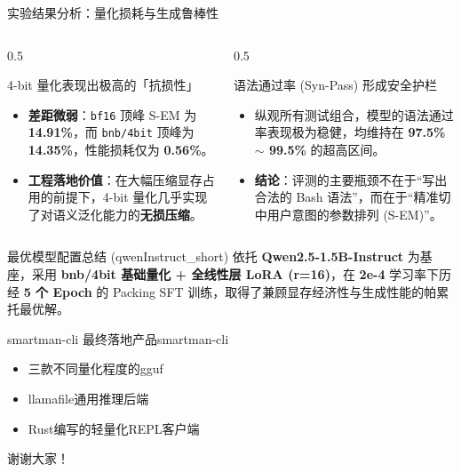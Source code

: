 \documentclass[aspectratio=169]{beamer}
\begin{document}
\begin{frame}{实验结果分析：量化损耗与生成鲁棒性}
    \begin{columns}[T]
        \begin{column}{0.5\textwidth}
            \begin{block}{4-bit 量化表现出极高的「抗损性」}
                \begin{itemize}
                    \item \textbf{差距微弱}：\texttt{bf16} 顶峰 S-EM 为 \textbf{14.91\%}，而 \texttt{bnb/4bit} 顶峰为 \textbf{14.35\%}，性能损耗仅为 \textbf{0.56\%}。
                    \item \textbf{工程落地价值}：在大幅压缩显存占用的前提下，4-bit 量化几乎实现了对语义泛化能力的\textbf{无损压缩}。
                \end{itemize}
            \end{block}
        \end{column}
        
        \begin{column}{0.5\textwidth}
            \begin{block}{语法通过率 (Syn-Pass) 形成安全护栏}
                \begin{itemize}
                    \item 纵观所有测试组合，模型的语法通过率表现极为稳健，均维持在 \textbf{97.5\% $\sim$ 99.5\%} 的超高区间。
                    \item \textbf{结论}：评测的主要瓶颈不在于“写出合法的 Bash 语法”，而在于“精准切中用户意图的参数排列 (S-EM)”。
                \end{itemize}
            \end{block}
        \end{column}
    \end{columns}

    \vspace{0.4cm}
    \begin{exampleblock}{最优模型配置总结 (qwenInstruct\_short)}
        依托 \textbf{Qwen2.5-1.5B-Instruct} 为基座，采用 \textbf{bnb/4bit 基础量化 + 全线性层 LoRA (r=16)}，在 \textbf{2e-4} 学习率下历经 \textbf{5 个 Epoch} 的 Packing SFT 训练，取得了兼顾显存经济性与生成性能的帕累托最优解。
    \end{exampleblock}
\end{frame}
\begin{frame}{smartman-cli}
  最终落地产品smartman-cli
  \begin{itemize}
    \item 三款不同量化程度的gguf
    \item llamafile通用推理后端
    \item Rust编写的轻量化REPL客户端
  \end{itemize}
\end{frame}
\begin{frame}[standout]
  谢谢大家！
\end{frame}
\end{document}

